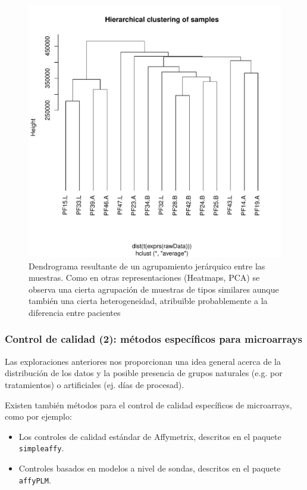 \documentclass[a4paper]{article}\usepackage[]{graphicx}\usepackage[]{color}
\makeatletter
\def\maxwidth{ %
  \ifdim\Gin@nat@width>\linewidth
    \linewidth
  \else
    \Gin@nat@width
  \fi
}
\newenvironment{knitrout}{}{} %
\newcommand{\Rpackage}[1]{{\texttt{#1}}}
\makeatother
\begin{document}
\begin{figure}
\centering
\begin{knitrout}
\color{fgcolor}
\includegraphics[width=\maxwidth]{images/graficplotDendro-1} 

\end{knitrout}
\caption{Dendrograma resultante de un agrupamiento jerárquico entre las muestras.
  Como en otras representaciones (Heatmaps, PCA) se observa una cierta agrupación de muestras de tipos similares aunque también una cierta heterogeneidad, atribuïble probablemente a la diferencia entre pacientes}
\label{fig:dendrograma}
\end{figure}

\subsubsection{Control de calidad (2): métodos específicos para microarrays}


Las exploraciones anteriores nos proporcionan una idea general acerca de la distribución de los datos y la posible presencia de grupos naturales (e.g. por tratamientos) o artificiales (ej. días de procesad).

Existen también métodos para el control de calidad específicos de microarrays, como por ejemplo:
\begin{itemize}
\item Los controles de calidad estándar de Affymetrix, descritos en el paquete \Rpackage{simpleaffy}.
\item Controles basados en modelos a nivel de sondas,  descritos en el paquete \Rpackage{affyPLM}.
\end{itemize}
\end{document}
